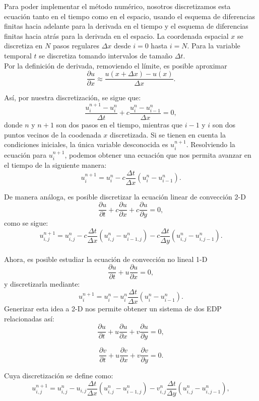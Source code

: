 \documentclass[A4,10pt]{article}
\begin{document}
\begin{multicols}{2}
Para poder implementar el método numérico, nosotros discretizamos esta ecuación tanto en el tiempo como en el espacio, usando el esquema de diferencias finitas hacia adelante\cite{Barbagroup,Girault} para la derivada en el tiempo y el esquema de diferencias finitas hacia atrás\cite{Barbagroup,Girault} para la derivada en el espacio. La coordenada espacial $x$ se discretiza en $N$ pasos regulares $\Delta x$ desde $i=0$ hasta $i=N$. Para la variable temporal $t$ se discretiza tomando intervalos de tamaño $\Delta t$.\\
Por la definición de derivada, removiendo el límite, es posible aproximar
$$\frac{\partial u}{\partial x}\approx \frac{u(x+\Delta x)-u(x)}{\Delta x}.$$

Así, por nuestra discretización, se sigue que:
$$\frac{u_i^{n+1}-u_i^n}{\Delta t} + c \frac{u_i^n - u_{i-1}^n}{\Delta x} = 0, $$
donde $n$ y $n+1$ son dos pasos en el tiempo, mientras que $i-1$ y $i$ son dos puntos vecinos de la coodenada $x$ discretizada. Si se tienen en cuenta la condiciones iniciales, la única variable desconocida es $u_i^{n+1}$. Resolviendo la ecuación para $u_i^{n+1}$, podemos obtener una ecuación que nos permita avanzar en el tiempo de la siguiente manera: 
$$u_i^{n+1} = u_i^n - c \frac{\Delta t}{\Delta x}(u_i^n-u_{i-1}^n).$$

De manera análoga, es posible discretizar la ecuación linear de convección 2-D
$$\frac{\partial u}{\partial t}+c\frac{\partial u}{\partial x} + c\frac{\partial u}{\partial y} = 0,$$
como se sigue:
$$u_{i,j}^{n+1} = u_{i,j}^n-c \frac{\Delta t}{\Delta x}(u_{i,j}^n-u_{i-1,j}^n)-c \frac{\Delta t}{\Delta y}(u_{i,j}^n-u_{i,j-1}^n).$$
\\

Ahora, es posible estudiar la ecuación de convección no lineal 1-D 
$$\frac{\partial u}{\partial t} + u \frac{\partial u}{\partial x} = 0,$$
y discretizarla mediante:
$$u_i^{n+1} = u_i^n - u_i^n \frac{\Delta t}{\Delta x} (u_i^n - u_{i-1}^n).$$
Generizar esta idea a 2-D nos permite obtener un sistema de dos EDP relacionadas así:
$$\frac{\partial u}{\partial t} + u \frac{\partial u}{\partial x} + v \frac{\partial u}{\partial y} = 0,$$

$$\frac{\partial v}{\partial t} + u \frac{\partial v}{\partial x} + v \frac{\partial v}{\partial y} = 0.$$

Cuya discretización se define como:
$$u_{i,j}^{n+1} = u_{i,j}^n - u_{i,j} \frac{\Delta t}{\Delta x} (u_{i,j}^n-u_{i-1,j}^n) - v_{i,j}^n \frac{\Delta t}{\Delta y} (u_{i,j}^n-u_{i,j-1}^n),$$


\end{multicols}
\end{document}
